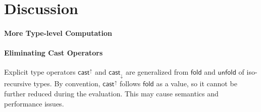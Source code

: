 \newcommand{\framedhslinecorrect}[2]%
  {#1[#2]}

\newcommand{\framedhs}{\sethscode{framedhscode}}


\newenvironment{inlinehscode}%
  {\(\def\column##1##2{}%
   \let\>\undefined\let\<\undefined\let\\\undefined
   \newcommand\>[1][]{}\newcommand\<[1][]{}\newcommand\\[1][]{}%
   \def\fromto##1##2##3{##3}%
   \def\nextline{}}{\) }%

\newcommand{\inlinehs}{\sethscode{inlinehscode}}


\newenvironment{joincode}%
  {\let\orighscode=\hscode
   \let\origendhscode=\endhscode
   \def\endhscode{\def\hscode{\endgroup\def\@currenvir{hscode}\\}\begingroup}
   \orighscode\def\hscode{\endgroup\def\@currenvir{hscode}}}%
  {\origendhscode
   \global\let\hscode=\orighscode
   \global\let\endhscode=\origendhscode}%

\makeatother
\EndFmtInput
%

\section{Discussion}
\label{sec:discuss}

\paragraph{More Type-level Computation}

\paragraph{Eliminating Cast Operators}

Explicit type \cast operators $ \mathsf{cast}^{\uparrow} $ and $ \mathsf{cast}_{\downarrow} $ are
generalized from $ \mathsf{fold} $ and $ \mathsf{unfold} $ of iso-recursive
types. By convention, $ \mathsf{cast}^{\uparrow} $ follows $ \mathsf{fold} $ as a value, so
it cannot be further reduced during the evaluation. This may cause
semantics and performance issues.

